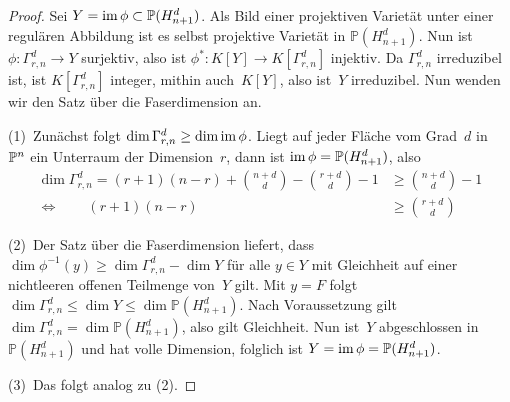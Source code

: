 \begin{proof}
Sei $Y = \operatorname{im} \phi \subset \mathbb P(H_{n+1}^d)$. Als Bild einer projektiven Varietät unter einer regulären Abbildung ist es selbst projektive Varietät in $\mathbb P(H_{n+1}^d)$. Nun ist $\phi \colon \Gamma_{r,n}^d \to Y$ surjektiv, also ist $\phi^* \colon K[Y] \to K[\Gamma_{r,n}^d]$ injektiv. Da $\Gamma_{r,n}^d$ irreduzibel ist, ist $K[\Gamma_{r,n}^d]$ integer, mithin auch~$K[Y]$, also ist~$Y$ irreduzibel. Nun wenden wir den Satz über die Faserdimension an.

(1)~Zunächst folgt $\dim \Gamma_{r,n}^d \geq \dim \operatorname{im} \phi$. Liegt auf jeder Fläche vom Grad~$d$ in~$\mathbb P^{n}$ ein Unterraum der Dimension~$r$, dann ist $\operatorname{im} \phi = \mathbb P(H_{n+1}^d)$, also
\begin{align*}
\dim \Gamma_{r,n}^d = (r+1)(n-r) + \binom{n+d}d - \binom{r+d}d - 1 &\geq \binom{n+d}d - 1 \\
\Leftrightarrow \qquad (r+1)(n-r) &\geq \binom{r+d}d
\end{align*}

(2)~Der Satz über die Faserdimension liefert, dass $\dim \phi^{-1}(y) \geq \dim \Gamma_{r,n}^d - \dim Y$ für alle $y \in Y$ mit Gleichheit auf einer nichtleeren offenen Teilmenge von~$Y$ gilt. Mit $y = F$ folgt $\dim \Gamma_{r,n}^d \leq \dim Y \leq \dim \mathbb P(H_{n+1}^d)$. Nach Voraussetzung gilt $\dim \Gamma_{r,n}^d = \dim \mathbb P(H_{n+1}^d)$, also gilt Gleichheit. Nun ist~$Y$ abgeschlossen in $\mathbb P(H_{n+1}^d)$ und hat volle Dimension, folglich ist $Y = \operatorname{im} \phi = \mathbb P(H_{n+1}^d)$.

(3)~Das folgt analog zu (2).
\end{proof}

